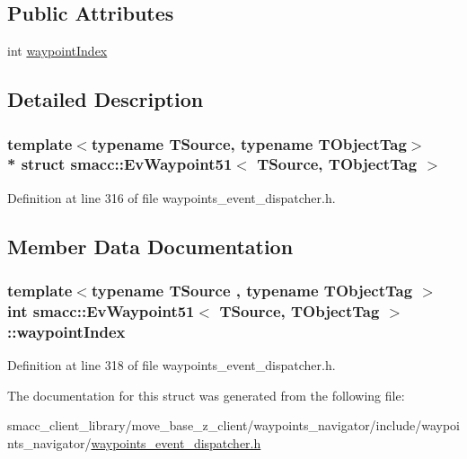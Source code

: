 \subsection*{Public Attributes}
\begin{DoxyCompactItemize}
\item 
int \hyperlink{structsmacc_1_1EvWaypoint51_aae88f1b3c35550ede0a00d1d9570d75c}{waypoint\+Index}
\end{DoxyCompactItemize}


\subsection{Detailed Description}
\subsubsection*{template$<$typename T\+Source, typename T\+Object\+Tag$>$\\*
struct smacc\+::\+Ev\+Waypoint51$<$ T\+Source, T\+Object\+Tag $>$}



Definition at line 316 of file waypoints\+\_\+event\+\_\+dispatcher.\+h.



\subsection{Member Data Documentation}
\subsubsection[{\texorpdfstring{waypoint\+Index}{waypointIndex}}]{\setlength{\rightskip}{0pt plus 5cm}template$<$typename T\+Source , typename T\+Object\+Tag $>$ int {\bf smacc\+::\+Ev\+Waypoint51}$<$ T\+Source, T\+Object\+Tag $>$\+::waypoint\+Index}\hypertarget{structsmacc_1_1EvWaypoint51_aae88f1b3c35550ede0a00d1d9570d75c}{}\label{structsmacc_1_1EvWaypoint51_aae88f1b3c35550ede0a00d1d9570d75c}


Definition at line 318 of file waypoints\+\_\+event\+\_\+dispatcher.\+h.



The documentation for this struct was generated from the following file\+:\begin{DoxyCompactItemize}
\item 
smacc\+\_\+client\+\_\+library/move\+\_\+base\+\_\+z\+\_\+client/waypoints\+\_\+navigator/include/waypoints\+\_\+navigator/\hyperlink{waypoints__event__dispatcher_8h}{waypoints\+\_\+event\+\_\+dispatcher.\+h}\end{DoxyCompactItemize}
